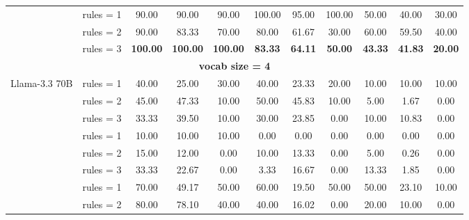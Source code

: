 \begin{table*}[t]
{\begin{tabular}{l c ccc ccc ccc}
           \hdashline
           \multirow{3}{*}{o3-mini} & rules = 1 & 90.00 & 90.00 & 90.00 & 100.00 & 95.00 & 100.00 & 50.00 & 40.00 & 30.00\\
           & rules = 2 & 90.00 & 83.33 & 70.00 & 80.00 & 61.67 & 30.00 & 60.00 & 59.50 & 40.00\\
           & \cellcolor{SeaGreen3!30}rules = 3 & \cellcolor{SeaGreen3!30}\textbf{100.00} & \cellcolor{SeaGreen3!30}\textbf{100.00} & \cellcolor{SeaGreen3!30}\textbf{100.00} & \cellcolor{SeaGreen3!30}\textbf{83.33} & \cellcolor{SeaGreen3!30}\textbf{64.11} & \cellcolor{SeaGreen3!30}\textbf{50.00} & \cellcolor{SeaGreen3!30}\textbf{43.33} & \cellcolor{SeaGreen3!30}\textbf{41.83} & \cellcolor{SeaGreen3!30}\textbf{20.00}\\
           \midrule 
           \multicolumn{11}{c}{\textbf{vocab size = 4}}\\
         \midrule
           \multirow{3}{*}{Llama-3.3 70B} & rules = 1 & 40.00 & 25.00 & 30.00 & 40.00 & 23.33 & 20.00 & 10.00 & 10.00 & 10.00\\
           & rules = 2 & 45.00 & 47.33 & 10.00 & 50.00 & 45.83 & 10.00 & 5.00 & 1.67 & 0.00\\
           & \cellcolor{SeaGreen3!50}rules = 3 & \cellcolor{SeaGreen3!50}33.33 & \cellcolor{SeaGreen3!50}39.50 & \cellcolor{SeaGreen3!50}10.00 & \cellcolor{SeaGreen3!50}30.00 & \cellcolor{SeaGreen3!50}23.85 & \cellcolor{SeaGreen3!50}0.00 & \cellcolor{SeaGreen3!50}10.00 & \cellcolor{SeaGreen3!50}10.83 & \cellcolor{SeaGreen3!50}0.00\\
           \hdashline
           \multirow{3}{*}{Llama-3.1 405B} & rules = 1 & 10.00 & 10.00 & 10.00 & 0.00 & 0.00 & 0.00 & 0.00 & 0.00 & 0.00\\
           & rules = 2 & 15.00 & 12.00 & 0.00 & 10.00 & 13.33 & 0.00 & 5.00 & 0.26 & 0.00\\
           & \cellcolor{SeaGreen3!50}rules = 3 & \cellcolor{SeaGreen3!50}33.33 & \cellcolor{SeaGreen3!50}22.67 & \cellcolor{SeaGreen3!50}0.00 & \cellcolor{SeaGreen3!50}3.33 & \cellcolor{SeaGreen3!50}16.67 & \cellcolor{SeaGreen3!50}0.00 & \cellcolor{SeaGreen3!50}13.33 & \cellcolor{SeaGreen3!50}1.85 & \cellcolor{SeaGreen3!50}0.00\\
           \hdashline
           \multirow{3}{*}{GPT-4o} & rules = 1 & 70.00 & 49.17 & 50.00 & 60.00 & 19.50 & 50.00 & 50.00 & 23.10 & 10.00\\
           & rules = 2 & 80.00 & 78.10 & 40.00 & 40.00 & 16.02 & 0.00 & 20.00 & 10.00 & 0.00\\

\end{tabular}}
\end{table*}

